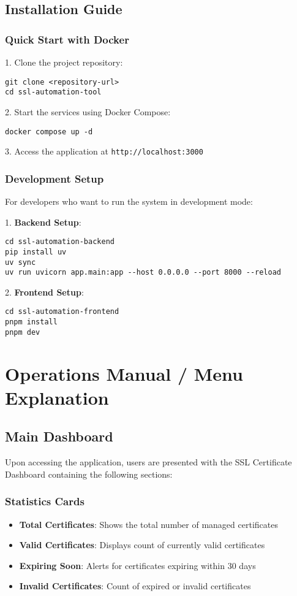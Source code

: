 \subsection{Installation Guide}

\subsubsection{Quick Start with Docker}

1. Clone the project repository:
\begin{verbatim}
git clone <repository-url>
cd ssl-automation-tool
\end{verbatim}

2. Start the services using Docker Compose:
\begin{verbatim}
docker compose up -d
\end{verbatim}

3. Access the application at \texttt{http://localhost:3000}

\subsubsection{Development Setup}

For developers who want to run the system in development mode:

1. \textbf{Backend Setup}:
\begin{verbatim}
cd ssl-automation-backend
pip install uv
uv sync
uv run uvicorn app.main:app --host 0.0.0.0 --port 8000 --reload
\end{verbatim}

2. \textbf{Frontend Setup}:
\begin{verbatim}
cd ssl-automation-frontend
pnpm install
pnpm dev
\end{verbatim}

\section{Operations Manual / Menu Explanation}

\subsection{Main Dashboard}

Upon accessing the application, users are presented with the SSL Certificate Dashboard containing the following sections:

\subsubsection{Statistics Cards}
\begin{itemize}
    \item \textbf{Total Certificates}: Shows the total number of managed certificates
    \item \textbf{Valid Certificates}: Displays count of currently valid certificates
    \item \textbf{Expiring Soon}: Alerts for certificates expiring within 30 days
    \item \textbf{Invalid Certificates}: Count of expired or invalid certificates
\end{itemize}

